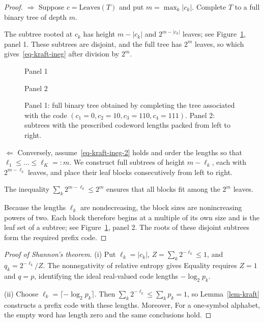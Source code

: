 \begin{proof}
	$\Rightarrow$ Suppose $c=\text{Leaves}(T)$ and put $m=\max_k |c_k|$. Complete $T$ to a full binary tree of depth $m$.
	 
	The subtree rooted at $c_k$ has height $m-|c_k|$ and $2^{m-|c_k|}$ leaves; see Figure~\ref{fig-kraft-trees}, panel 1. These subtrees are disjoint, and the full tree has $2^m$ leaves, so
	which gives~\eqref{eq-kraft-ineg} after division by $2^m$.
	
	\begin{figure}[tbp]
\centering
{\small\sffamily\color{BookMuted}Panel 1\par}\smallskip
{}
\par\medskip
{\small\sffamily\color{BookMuted}Panel 2\par}\smallskip
{}
\caption{Panel 1: full binary tree obtained by completing the tree associated with the code $(c_1=0, c_2=10, c_3=110, c_4=111)$.
	Panel 2: subtrees with the prescribed codeword lengths packed from left to right.}
\label{fig-kraft-trees}
\end{figure}

	
	$\Leftarrow$ Conversely, assume~\eqref{eq-kraft-ineg-2} holds and order the lengths so that $\ell_1 \leq \ldots \leq \ell_K =: m$.
	We construct full subtrees of height $m-\ell_k$, each with $2^{m-\ell_k}$ leaves, and place their leaf blocks consecutively from left to right.
	 
	The inequality $\sum_k 2^{m-\ell_k} \leq 2^m$ ensures that all blocks fit among the $2^m$ leaves.
	 
	Because the lengths $\ell_k$ are nondecreasing, the block sizes are nonincreasing powers of two. Each block therefore begins at a multiple of its own size and is the leaf set of a subtree; see Figure~\ref{fig-kraft-trees}, panel 2. The roots of these disjoint subtrees form the required prefix code.
\end{proof}



\begin{proof}[Proof of Shannon's theorem]
(i) Put $\ell_k=|c_k|$, $Z=\sum_k2^{-\ell_k}\leq1$, and $q_k=2^{-\ell_k}/Z$. The nonnegativity of relative entropy gives
Equality requires $Z=1$ and $q=p$, identifying the ideal real-valued code lengths $-\log_2p_k$.

(ii) Choose $\ell_k=\lceil-\log_2p_k\rceil$. Then $\sum_k2^{-\ell_k}\leq\sum_kp_k=1$, so Lemma~\ref{lem-kraft} constructs a prefix code with these lengths. Moreover,
For a one-symbol alphabet, the empty word has length zero and the same conclusions hold.
\end{proof}

